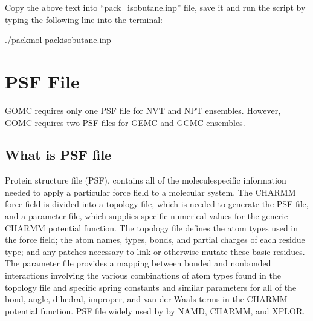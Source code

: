 \documentclass[letterpaper,10pt,english]{sphinxmanual}
\begin{document}
Copy the above text into “pack\_isobutane.inp” file, save it and run the script by typing the following line into the terminal:

\begin{sphinxVerbatim}[commandchars=\\\{\}]
\PYGZdl{} ./packmol \PYGZlt{} pack\PYGZus{}isobutane.inp
\end{sphinxVerbatim}


\section{PSF File}
\label{\detokenize{input_file:psf-file}}
GOMC requires only one PSF file for NVT and NPT ensembles. However, GOMC requires two PSF files for GEMC and GCMC ensembles.


\subsection{What is PSF file}
\label{\detokenize{input_file:what-is-psf-file}}
Protein structure file (PSF), contains all of the molecule\sphinxhyphen{}specific information needed to apply a particular force field to a molecular system.
The CHARMM force field is divided into a topology file, which is needed to generate the PSF file, and a parameter file, which supplies specific numerical
values for the generic CHARMM potential function. The topology file defines the atom types used in the force field; the atom names, types, bonds, and partial
charges of each residue type; and any patches necessary to link or otherwise mutate these basic residues. The parameter file provides a mapping between bonded
and nonbonded interactions involving the various combinations of atom types found in the topology file and specific spring constants and similar parameters for
all of the bond, angle, dihedral, improper, and van der Waals terms in the CHARMM potential function. PSF file widely used by by NAMD, CHARMM, and X\sphinxhyphen{}PLOR.
\end{document}
